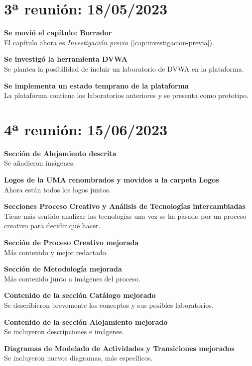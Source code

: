     \section{3ª reunión: 18/05/2023}

        \textbf{Se movió el capítulo: Borrador} \\
        El capítulo ahora es \textit{Investigación previa} (\ref{cap:investigacion-previa}).

        \textbf{Se investigó la herramienta DVWA} \\
        Se plantea la posibilidad de incluir un laboratorio de DVWA en la plataforma.

        \textbf{Se implementa un estado temprano de la plataforma} \\
        La plataforma contiene los laboratorios anteriores y se presenta como prototipo.


    \section{4ª reunión: 15/06/2023}

        \textbf{Sección de Alojamiento descrita} \\
        Se añadieron imágenes.

        \textbf{Logos de la UMA renombrados y movidos a la carpeta Logos} \\
        Ahora están todos los logos juntos.

        \textbf{Secciones Proceso Creativo y Análisis de Tecnologías intercambiadas} \\
        Tiene más sentido analizar las tecnologías una vez se ha pasado por un proceso creativo para decidir qué hacer.

        \textbf{Sección de Proceso Creativo mejorada} \\
        Más contenido y mejor redactado.

        \textbf{Sección de Metodología mejorada} \\
        Más contenido junto a imágenes del proceso.

        \textbf{Contenido de la sección Catálogo mejorado} \\
        Se describieron brevemente los conceptos y sus posibles laboratorios.

        \textbf{Contenido de la sección Alojamiento mejorado} \\
        Se incluyeron descripciones e imágenes.

        \textbf{Diagramas de Modelado de Actividades y Transiciones mejorados} \\
        Se incluyeron nuevos diagramas, más específicos.


